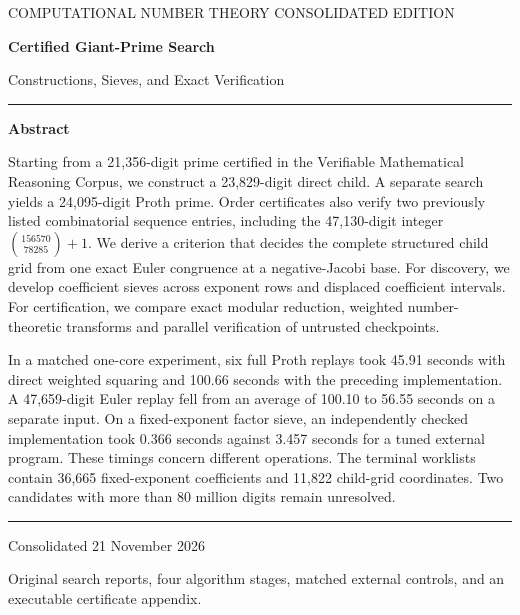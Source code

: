 \documentclass[11pt,a4paper,oneside,openany]{report}
\begin{document}
\begin{titlepage}
\thispagestyle{empty}
{\sffamily\small\color{teal} COMPUTATIONAL NUMBER THEORY \hfill CONSOLIDATED EDITION}\par
\vspace{16mm}
{\fontsize{32}{37}\selectfont\bfseries\color{ink} Certified Giant-Prime Search}\par
\vspace{3mm}
{\Large\color{ink} Constructions, Sieves, and Exact Verification}\par
\vspace{7mm}
{\color{rulegray}\rule{\linewidth}{0.9pt}}\par
\vspace{5mm}
{\large\bfseries Abstract}\par
Starting from a 21,356-digit prime certified in the Verifiable Mathematical Reasoning Corpus, we construct a 23,829-digit direct child. A separate search yields a 24,095-digit Proth prime. Order certificates also verify two previously listed combinatorial sequence entries, including the 47,130-digit integer $\binom{156570}{78285}+1$. We derive a criterion that decides the complete structured child grid from one exact Euler congruence at a negative-Jacobi base. For discovery, we develop coefficient sieves across exponent rows and displaced coefficient intervals. For certification, we compare exact modular reduction, weighted number-theoretic transforms and parallel verification of untrusted checkpoints.
\par
In a matched one-core experiment, six full Proth replays took 45.91 seconds with direct weighted squaring and 100.66 seconds with the preceding implementation. A 47,659-digit Euler replay fell from an average of 100.10 to 56.55 seconds on a separate input. On a fixed-exponent factor sieve, an independently checked implementation took 0.366 seconds against 3.457 seconds for a tuned external program. These timings concern different operations. The terminal worklists contain 36,665 fixed-exponent coefficients and 11,822 child-grid coordinates. Two candidates with more than 80 million digits remain unresolved.
\vfill
{\color{rulegray}\rule{\linewidth}{0.65pt}}\par
{\sffamily\small\color{teal} Consolidated 21 November 2026}\par
\small Original search reports, four algorithm stages, matched external controls, and an executable certificate appendix.
\end{titlepage}
\setcounter{page}{2}
{\small\setlength{\parskip}{0pt}\tableofcontents}
\clearpage{}
\end{document}
